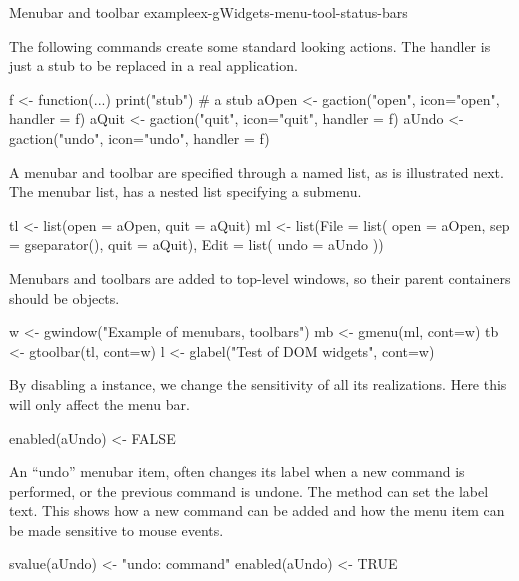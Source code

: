 \begin{example}{Menubar and toolbar example}{ex-gWidgets-menu-tool-status-bars}

The following commands create some standard looking actions. The
handler  is just a stub to be replaced in a real application.
\begin{Schunk}
\begin{Sinput}
 f <- function(...) print("stub")        # a stub
 aOpen <- gaction("open", icon="open", handler = f)
 aQuit <- gaction("quit", icon="quit", handler = f)
 aUndo <- gaction("undo", icon="undo", handler = f)
\end{Sinput}
\end{Schunk}

A menubar and toolbar are specified through a  named list, as is
illustrated next. The menubar list, has a nested list specifying a submenu.
\begin{Schunk}
\begin{Sinput}
 tl <- list(open = aOpen, quit = aQuit)
 ml <- list(File = list(
              open = aOpen, 
              sep = gseparator(), 
              quit = aQuit),
            Edit = list(
              undo = aUndo
              ))
\end{Sinput}
\end{Schunk}


Menubars and toolbars are added to top-level windows, so their parent
containers should be  objects.
\begin{Schunk}
\begin{Sinput}
 w <- gwindow("Example of menubars, toolbars")
 mb <- gmenu(ml, cont=w)
 tb <- gtoolbar(tl, cont=w)
 l <- glabel("Test of DOM widgets", cont=w)
\end{Sinput}
\end{Schunk}


By disabling a  instance, we change the sensitivity of
all its realizations. Here this will only affect the menu bar.

\begin{Schunk}
\begin{Sinput}
 enabled(aUndo) <- FALSE
\end{Sinput}
\end{Schunk}

An ``undo'' menubar item, often changes its label when a new command
is performed, or the previous command is undone. The
 method can set the label text. This
shows how a new command can be added and how the menu item can be made
sensitive to mouse events.
\begin{Schunk}
\begin{Sinput}
 svalue(aUndo) <- "undo: command"
 enabled(aUndo) <- TRUE
\end{Sinput}
\end{Schunk}


\end{example}
